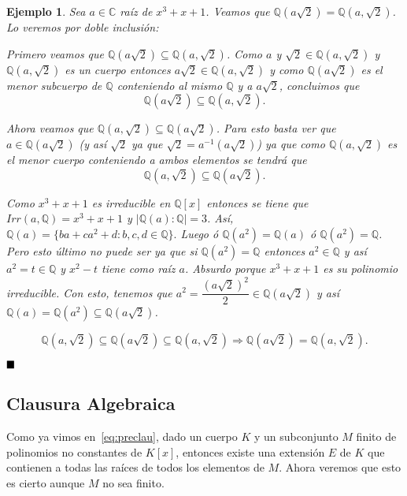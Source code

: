 \documentclass[12pt]{article}
\newtheorem{example}{Ejemplo}[theorem]
\begin{document}
\begin{example} Sea $a\in \mathbb{C}$ raíz de $x^{3}+x+1$. Veamos que $\mathbb{Q}(a\sqrt{2}) = \mathbb{Q}(a,\sqrt{2})$. Lo veremos por doble inclusión:

Primero veamos que $\mathbb{Q}(a\sqrt{2}) \subseteq \mathbb{Q}(a,\sqrt{2})$. Como $a$ y $\sqrt{2} \in \mathbb{Q}(a,\sqrt{2})$ y $\mathbb{Q}(a,\sqrt{2})$ es un cuerpo entonces $a \sqrt{2} \in \mathbb{Q}(a,\sqrt{2})$ y como $\mathbb{Q}(a\sqrt{2})$ es el menor subcuerpo de $\mathbb{Q}$ conteniendo al mismo $\mathbb{Q}$ y a $a\sqrt{2}$, concluimos que $$\mathbb{Q}(a\sqrt{2}) \subseteq \mathbb{Q}(a,\sqrt{2}).$$

Ahora veamos que $\mathbb{Q}(a, \sqrt{2}) \subseteq \mathbb{Q}(a\sqrt{2})$. Para esto basta ver que $a \in \mathbb{Q}(a\sqrt{2})$ (y así $\sqrt{2}$ ya que $\sqrt{2} = a^{-1}(a\sqrt{2})$) ya que como $\mathbb{Q}(a, \sqrt{2})$ es el menor cuerpo conteniendo a ambos elementos se tendrá que $$\mathbb{Q}(a,\sqrt{2}) \subseteq \mathbb{Q}(a\sqrt{2}).$$

Como $x^{3}+x+1$ es irreducible en $\mathbb{Q}[x]$ entonces se tiene que $Irr(a, \mathbb{Q}) = x^{3}+x+1$ y $|\mathbb{Q}(a) : \mathbb{Q}| = 3$. Así, $\mathbb{Q}(a) = \lbrace ba + ca^{2} + d : b,c,d \in \mathbb{Q} \rbrace.$ Luego ó $\mathbb{Q}(a^{2}) = \mathbb{Q}(a)$ ó $\mathbb{Q}(a^{2}) = \mathbb{Q}$. Pero esto último no puede ser ya que si $\mathbb{Q}(a^{2}) = \mathbb{Q}$ entonces $a^{2} \in \mathbb{Q}$ y así $a^{2} = t \in \mathbb{Q}$ y $x^{2}-t$ tiene como raíz $a$. Absurdo porque $x^{3}+x+1$ es su polinomio irreducible. Con esto, tenemos que $a^{2}= \dfrac{(a\sqrt{2})^{2}}{2} \in \mathbb{Q}(a\sqrt{2})$ y así $\mathbb{Q}(a) = \mathbb{Q}(a^{2}) \subseteq \mathbb{Q}(a\sqrt{2})$.

$$\mathbb{Q}(a,\sqrt{2}) \subseteq \mathbb{Q}(a\sqrt{2}) \subseteq \mathbb{Q}(a,\sqrt{2})\Rightarrow \mathbb{Q}(a\sqrt{2}) = \mathbb{Q}(a, \sqrt{2}).$$
\end{example}

$\hfill \blacksquare$

\subsection{Clausura Algebraica}
Como ya vimos en~\ref{eq:preclau}, dado un cuerpo $K$ y un subconjunto $M$ finito de polinomios no constantes de $K[x]$, entonces existe una extensión $E$ de $K$ que contienen a todas las raíces de todos los elementos de $M$. Ahora veremos que esto es cierto aunque $M$ no sea finito.
\end{document}
